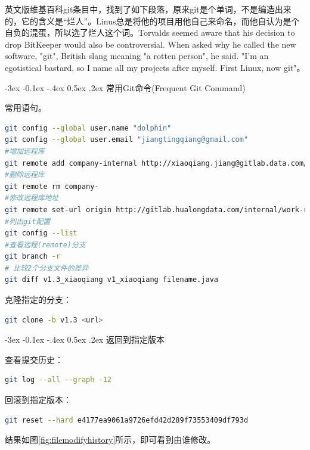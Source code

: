\documentclass[12pt]{book}
\makeatletter
\numberwithin{dummy}{section}
\theoremstyle{ocrenumbox}
\theoremstyle{blacknumex}
\theoremstyle{blacknumbox}
\theoremstyle{ocrenum}
\renewcommand{\subsection}{\@startsection {subsection}{2}{\z@}
	{-3ex \@plus -0.1ex \@minus -.4ex}
	{0.5ex \@plus.2ex }
	{\normalfont\sffamily\bfseries}}
\makeatother
\begin{document}
英文版维基百科git条目中，找到了如下段落，原来git是个单词，不是编造出来的，它的含义是“烂人”。Linus总是将他的项目用他自己来命名，而他自认为是个自负的混蛋，所以选了烂人这个词。Torvalds seemed aware that his decision to drop BitKeeper would also be controversial. When asked why he called the new software, "git", British slang meaning "a rotten person", he said. "I'm an egotistical bastard, so I name all my projects after myself. First Linux, now git"。

\subsection{常用Git命令(Frequent Git Command)}

常用语句。

\begin{lstlisting}[language=Bash]
git config --global user.name "dolphin"
git config --global user.email "jiangtingqiang@gmail.com"
#增加远程库
git remote add company-internal http://xiaoqiang.jiang@gitlab.data.com/backend/system.git
#删除远程库
git remote rm company-
#修改远程库地址
git remote set-url origin http://gitlab.hualongdata.com/internal/work-record.git
#列出git配置
git config --list
#查看远程(remote)分支
git branch -r
# 比较2个分支文件的差异
git diff v1.3_xiaoqiang v1_xiaoqiang filename.java
\end{lstlisting}

克隆指定的分支：

\begin{lstlisting}[language=Bash]
git clone -b v1.3 <url>
\end{lstlisting}

\subsection{返回到指定版本}

查看提交历史：

\begin{lstlisting}[language=Bash]
git log --all --graph -12
\end{lstlisting}

回滚到指定版本：

\begin{lstlisting}[language=Bash]
git reset --hard e4177ea9061a9726efd42d289f73553409df793d
\end{lstlisting}

结果如图\ref{fig:filemodifyhistory}所示，即可看到由谁修改。
\end{document}

